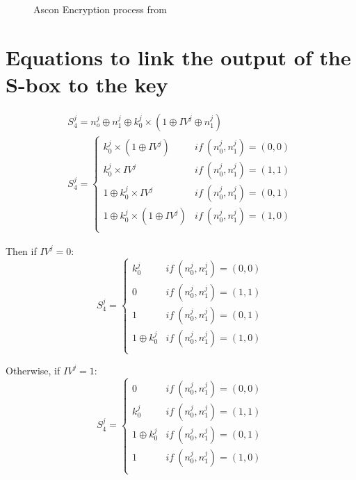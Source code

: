 \documentclass[11pt,technote]{IEEEtran}
\begin{document}
		\begin{figure}[H]
			\centering
			
			\caption{Ascon Encryption process from \cite{cours_crypto}}
			\label{fig:enc}
		\end{figure}
		
		
		\section{Equations to link the output of the S-box to the key} \label{equations}
		\begin{gather*}
			S_4^j = n_o^j \oplus n_1^j \oplus k_0^j \times (1 \oplus IV^j \oplus n_1^j)\\
			S _4^j =\left \{	
				\begin{array}{ll}
					k_0^j \times (1 \oplus IV^j) & if\ (n_0^j,n_1^j)=(0,0)\\
					k_0^j \times IV^j & if\ (n_0^j,n_1^j)=(1,1)\\
					1 \oplus k_0^j \times IV^j & if\ (n_0^j,n_1^j)=(0,1)\\
					1 \oplus k_0^j \times (1 \oplus IV^j) & if\ (n_0^j,n_1^j)=(1,0)\\
				\end{array}
					\right.
		\end{gather*}
		 
		 \noindent Then if $IV^j = 0$: 
		 $$S _4^j =\left \{	
		 \begin{array}{ll}
		 	k_0^j& if\ (n_0^j,n_1^j)=(0,0)\\
		 	0& if\ (n_0^j,n_1^j)=(1,1)\\
		 	1& if\ (n_0^j,n_1^j)=(0,1)\\
		 	1 \oplus k_0^j& if\ (n_0^j,n_1^j)=(1,0)\\
		 \end{array}
		 \right.$$
		 
		 \noindent Otherwise, if $IV^j = 1$:
		 $$S _4^j =\left \{	
		 \begin{array}{ll}
		 	0& if\ (n_0^j,n_1^j)=(0,0)\\
		 	k_0^j& if\ (n_0^j,n_1^j)=(1,1)\\
		 	1 \oplus k_0^j& if\ (n_0^j,n_1^j)=(0,1)\\
		 	1& if\ (n_0^j,n_1^j)=(1,0)\\
		 \end{array}
		 \right.$$
		 
		 
\end{document}
